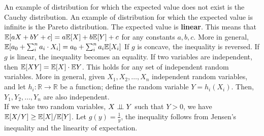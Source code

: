 An example of distribution for which the expected value does not exist is the Cauchy distribution. An example of distribution for which the expected value is infinite is the Pareto distribution.
The expected value is \textbf{linear}. This means that $\mathbb{E}[aX + bY + c] = a\mathbb{E}[X] + b\mathbb{E}[Y] + c$ for any constants $a, b, c$. More in general, $\mathbb{E}[a_0 + \sum_i^n a_i \cdot X_i] = a_0 + \sum_i^n a_i \mathbb{E}[X_i]$
If $g$ is concave, the inequality is reversed. If $g$ is linear, the inequality becomes an equality.
If two variables are independent, then $\mathbb{E}[XY] = \mathbb{E}[X] \cdot \mathbb{E}{Y}$. This holds for any set of independent random variables. More in general, given $X_1, X_2, \dots, X_n$ independent random variables, and let $h_i : \mathbb{R} \rightarrow \mathbb{R}$ be a function; define the random variable $Y = h_i(X_i)$. Then, $Y_1, Y_2, \dots, Y_n$ are also independent. \\
If we take two random variables, $X \perp \!\!\! \perp Y$ such that $Y > 0$, we have $\mathbb{E}[X/Y] \geq \mathbb{E}[X]/\mathbb{E}[Y]$. Let $g(y) = \frac{1}{y}$, the inequality follows from Jensen's inequality and the linearity of expectation.

